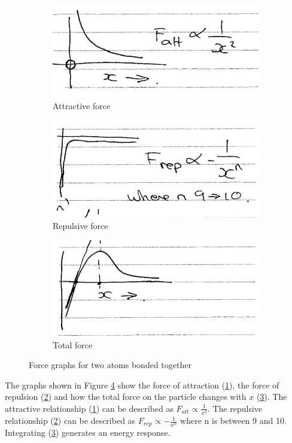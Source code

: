 \documentclass[class=report, crop=false, 12pt,a4paper]{standalone}
\begin{document}
\begin{figure}[h!]
  \centering
  \begin{subfigure}[b]{0.3\textwidth}
      \includegraphics[width=\textwidth]{../img/forcegraph1}
      \caption{Attractive force}
      \label{attractiveforce}
  \end{subfigure}
  \begin{subfigure}[b]{0.3\textwidth}
      \includegraphics[width=\textwidth]{../img/forcegraph2}
      \caption{Repulsive force}
      \label{repulsiveforce}
  \end{subfigure}
  \begin{subfigure}[b]{0.3\textwidth}
      \includegraphics[width=\textwidth]{../img/forcegraph3}
      \caption{Total force}
      \label{totalforce}
  \end{subfigure}
  \caption{Force graphs for two atoms bonded together}\label{forcegraphs}
\end{figure}
The graphs shown in Figure \ref{forcegraphs} show the force of attraction (\ref{attractiveforce}), the force of repulsion (\ref{repulsiveforce}) and how the total force on the particle changes with $x$ (\ref{totalforce}). The attractive relationship (\ref{attractiveforce}) can be described as $F_{att} \propto \frac{1}{x^2}$. The repulsive relationship (\ref{repulsiveforce}) can be described as $F_{rep} \propto -\frac{1}{x^n}$ where n is between 9 and 10. Integrating (\ref{totalforce}) generates an energy response.
\end{document}

